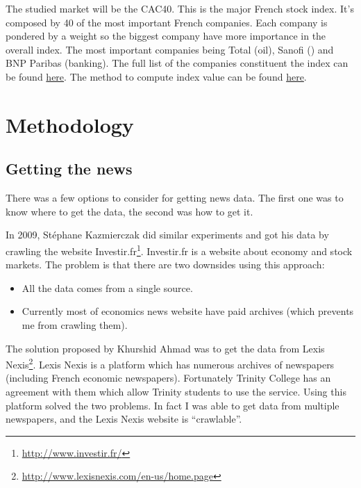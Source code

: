 \documentclass[12pt]{report}
\begin{document}
		The studied market will be the CAC40. This is the major French stock index. It's composed by 40 of the most important French companies. Each company is pondered by a weight so the biggest company have more importance in the overall index. The most important companies being Total (oil), Sanofi () and BNP Paribas (banking). The full list of the companies constituent the index can be found \href{http://en.wikipedia.org/wiki/CAC40}{here}. The method to compute index value can be found \href{http://www.euronext.com/fic/000/050/871/508718.pdf}{here}.
	
	\chapter{Methodology}
		\section{Getting the news}
		
			There was a few options to consider for getting news data. The first one was to know where to get the data, the second was how to get it.
			
			In 2009, Stéphane Kazmierczak \cite{kazmierczak08} did similar experiments and got his data by crawling the website Investir.fr\footnote{\url{http://www.investir.fr/}}. Investir.fr is a website about economy and stock markets. The problem is that there are two downsides using this approach:
			\begin{itemize}
				\item All the data comes from a single source.
				\item Currently most of economics news website have paid archives (which prevents me from crawling them).
			\end{itemize}
			
			The solution proposed by Khurshid Ahmad was to get the data from Lexis Nexis\footnote{\url{http://www.lexisnexis.com/en-us/home.page}}. Lexis Nexis is a platform which has numerous archives of newspapers (including French economic newspapers). Fortunately Trinity College has an agreement with them which allow Trinity students to use the service. Using this platform solved the two problems. In fact I was able to get data from multiple newspapers, and the Lexis Nexis website is ``crawlable''.
			
\end{document}
